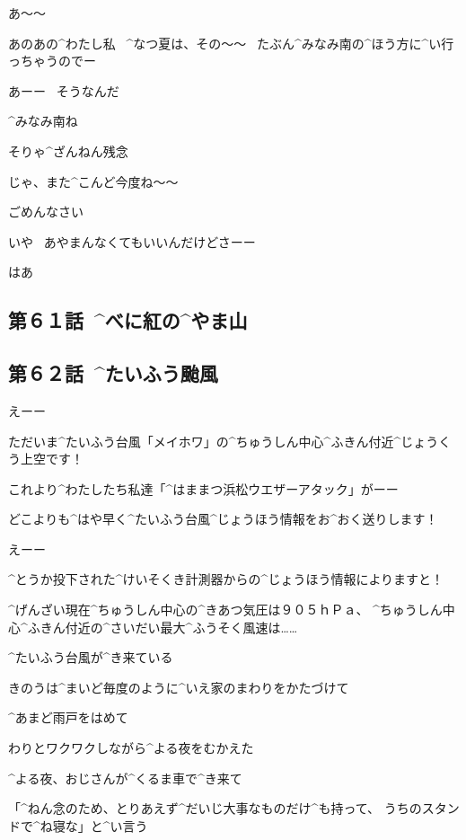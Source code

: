 \Kokone あ〜〜

\Kokone あのあの^{わたし}{私}
\ ^{なつ}{夏}は、その〜〜
\ たぶん^{みなみ}{南}の^{ほう}{方}に^{い}{行}っちゃうのでー

\Maruko あーー
\ そうなんだ

\Maruko ^{みなみ}{南}ね

\Maruko そりゃ^{ざんねん}{残念}

\page[88]
\Maruko じゃ、また^{こんど}{今度}ね〜〜

\Kokone ごめんなさい

\Maruko いや
\ あやまんなくてもいいんだけどさーー

\Kokone はあ


\subsection{第６１話\ ^{べに}{紅}の^{やま}{山}}


\subsection{第６２話\ ^{たいふう}{颱風}}

\page[98]
\Person えーー

\Person ただいま^{たいふう}{台風}「メイホワ」の^{ちゅうしん}{中心}^{ふきん}{付近}^{じょうくう}{上空}です！

\Person これより^{わたしたち}{私達}「^{はままつ}{浜松}ウエザーアタック」がーー

\Person どこよりも^{はや}{早}く^{たいふう}{台風}^{じょうほう}{情報}をお^{おく}{送}りします！

\page[99]
\Person えーー

\Person ^{とうか}{投下}された^{けいそくき}{計測器}からの^{じょうほう}{情報}によりますと！

\Person ^{げんざい}{現在}^{ちゅうしん}{中心}の^{きあつ}{気圧}は９０５ｈＰａ、
^{ちゅうしん}{中心}^{ふきん}{付近}の^{さいだい}{最大}^{ふうそく}{風速}は……

\page[100]
\Alpha ^{たいふう}{台風}が^{き}{来}ている

\Alpha きのうは^{まいど}{毎度}のように^{いえ}{家}のまわりをかたづけて

\Alpha ^{あまど}{雨戸}をはめて

\Alpha わりとワクワクしながら^{よる}{夜}をむかえた

\Alpha ^{よる}{夜}、おじさんが^{くるま}{車}で^{き}{来}て

\Alpha 「^{ねん}{念}のため、とりあえず^{だいじ}{大事}なものだけ^{も}{持}って、
うちのスタンドで^{ね}{寝}な」と^{い}{言}う

